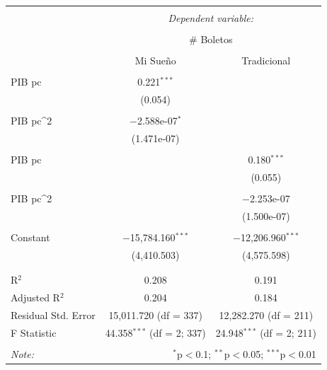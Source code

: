 \begin{table}[H]
\centering 
\begin{tabular}{@{\extracolsep{5pt}}lcc} 
\\[-1.8ex]\hline 
\hline \\[-1.8ex] 
 & \multicolumn{2}{c}{\textit{Dependent variable:}} \\ 
\cline{2-3} 
\\[-1.8ex] & \multicolumn{2}{c}{\# Boletos} \\ 
\\[-1.8ex] & Mi Sueño & Tradicional\\ 
\hline \\[-1.8ex] 
 PIB pc & 0.221$^{***}$ &  \\ 
  & (0.054) &  \\ 
  & & \\ 
 PIB pc^2 & $-$2.588e-07$^{*}$ &  \\ 
  & (1.471e-07) &  \\ 
  & & \\ 
 PIB pc &  & 0.180$^{***}$ \\ 
  &  & (0.055) \\ 
  & & \\ 
 PIB pc^2 &  & $-$2.253e-07 \\ 
  &  & (1.500e-07) \\ 
  & & \\ 
 Constant & $-$15,784.160$^{***}$ & $-$12,206.960$^{***}$ \\ 
  & (4,410.503) & (4,575.598) \\ 
  & & \\ 
\hline \\[-1.8ex] 
R$^{2}$ & 0.208 & 0.191 \\ 
Adjusted R$^{2}$ & 0.204 & 0.184 \\ 
Residual Std. Error & 15,011.720 (df = 337) & 12,282.270 (df = 211) \\ 
F Statistic & 44.358$^{***}$ (df = 2; 337) & 24.948$^{***}$ (df = 2; 211) \\ 
\hline 
\hline \\[-1.8ex] 
\textit{Note:}  & \multicolumn{2}{r}{$^{*}$p$<$0.1; $^{**}$p$<$0.05; $^{***}$p$<$0.01} \\ 
\end{tabular} 
\end{table}





